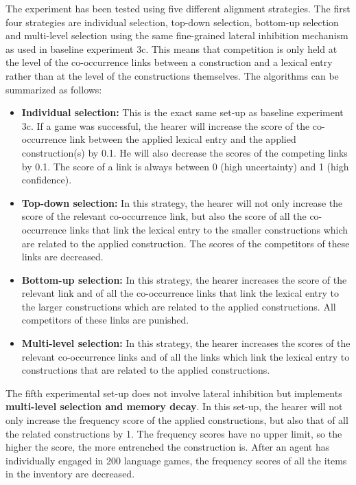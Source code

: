 The experiment has been tested using five different alignment strategies. The first four strategies are individual selection, top-down selection, bottom-up selection and multi-level selection using the same fine-grained lateral inhibition mechanism as used in baseline experiment 3c. This means that competition is only held at the level of the co-occurrence links between a construction and a lexical entry rather than at the level of the constructions themselves. The algorithms can be summarized as follows:

\begin{itemize}
\item {\bfseries Individual selection:} This is the exact same set-up as baseline experiment 3c. If a game was successful, the hearer will increase the score of the co-occurrence link between the applied lexical entry and the applied construction(s) by 0.1. He will also decrease the scores of the competing links by 0.1. The score of a link is always between 0 (high uncertainty) and 1 (high confidence).
\item {\bfseries Top-down selection:} In this strategy, the hearer will not only increase the score of the relevant co-occurrence link, but also the score of all the co-occurrence links that link the lexical entry to the smaller constructions which are related to the applied construction. The scores of the competitors of these links are decreased.
\item {\bfseries Bottom-up selection:}  In this strategy, the hearer increases the score of the relevant link and of all the co-occurrence links that link the lexical entry to the larger constructions which are related to the applied constructions. All competitors of these links are punished.
\item {\bfseries Multi-level selection:} In this strategy, the hearer increases the scores of the relevant co-occurrence links and of all the links which link the lexical entry to constructions that are related to the applied constructions.
\end{itemize}

The fifth experimental set-up does not involve lateral inhibition but implements {\bfseries multi-level selection and memory decay}. In this set-up, the hearer will not only increase the frequency score of the applied constructions, but also that of all the related constructions by 1. The frequency scores have no upper limit, so the higher the score, the more entrenched the construction is. After an agent has individually engaged in 200 language games, the frequency scores of all the items in the inventory are decreased.

